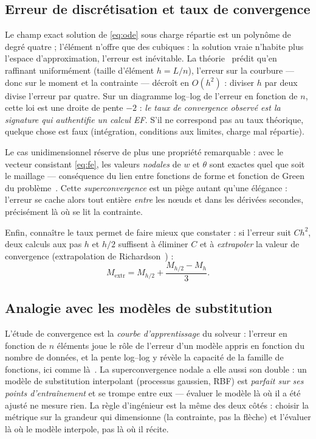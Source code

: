 \documentclass[10pt,journal]{IEEEtran}
\begin{document}
\subsection{Erreur de discrétisation et taux de convergence}
\label{sec:taux}
Le champ exact solution de \eqref{eq:ode} sous charge répartie est un polynôme de degré quatre ; l'élément n'offre que des cubiques : la solution vraie n'habite plus l'espace d'approximation, l'erreur est inévitable. La théorie~\cite{zienkiewicz,hughes} prédit qu'en raffinant uniformément (taille d'élément $h = L/n$), l'erreur sur la courbure --- donc sur le moment et la contrainte --- décroît en $O(h^2)$ : diviser $h$ par deux divise l'erreur par quatre. Sur un diagramme log--log de l'erreur en fonction de $n$, cette loi est une droite de pente $-2$ : \emph{le taux de convergence observé est la signature qui authentifie un calcul EF}. S'il ne correspond pas au taux théorique, quelque chose est faux (intégration, conditions aux limites, charge mal répartie).

Le cas unidimensionnel réserve de plus une propriété remarquable : avec le vecteur consistant \eqref{eq:fe}, les valeurs \emph{nodales} de $w$ et $\theta$ sont exactes quel que soit le maillage --- conséquence du lien entre fonctions de forme et fonction de Green du problème~\cite{tong}. Cette \emph{superconvergence} est un piège autant qu'une élégance : l'erreur se cache alors tout entière \emph{entre} les n\oe{}uds et dans les dérivées secondes, précisément là où se lit la contrainte.

Enfin, connaître le taux permet de faire mieux que constater : si l'erreur suit $Ch^2$, deux calculs aux pas $h$ et $h/2$ suffisent à éliminer $C$ et à \emph{extrapoler} la valeur de convergence (extrapolation de Richardson~\cite{oberkampf}) :
\begin{equation}
M_{\text{extr}} = M_{h/2} + \frac{M_{h/2}-M_{h}}{3}.
\label{eq:richardson}
\end{equation}

\subsection{Analogie avec les modèles de substitution}
L'étude de convergence est la \emph{courbe d'apprentissage} du solveur : l'erreur en fonction de $n$ éléments joue le rôle de l'erreur d'un modèle appris en fonction du nombre de données, et la pente log--log y révèle la capacité de la famille de fonctions, ici comme là~\cite{forrester}. La superconvergence nodale a elle aussi son double : un modèle de substitution interpolant (processus gaussien, RBF) est \emph{parfait sur ses points d'entraînement} et se trompe entre eux --- évaluer le modèle là où il a été ajusté ne mesure rien. La règle d'ingénieur est la même des deux côtés : choisir la métrique sur la grandeur qui dimensionne (la contrainte, pas la flèche) et l'évaluer là où le modèle interpole, pas là où il récite.
\end{document}
